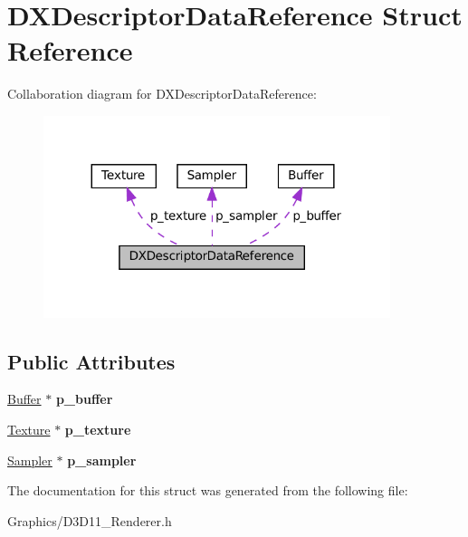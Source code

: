 \hypertarget{structDXDescriptorDataReference}{}\section{D\+X\+Descriptor\+Data\+Reference Struct Reference}
\label{structDXDescriptorDataReference}


Collaboration diagram for D\+X\+Descriptor\+Data\+Reference\+:\nopagebreak
\begin{figure}[H]
\begin{center}
\leavevmode
\includegraphics[width=287pt]{structDXDescriptorDataReference__coll__graph}
\end{center}
\end{figure}
\subsection*{Public Attributes}
\begin{DoxyCompactItemize}
\item 
\mbox{\label{structDXDescriptorDataReference_a0076efe8a7e79cc0e8e4bdcda8d4fb55}} 
\hyperlink{classBuffer}{Buffer} $\ast$ {\bfseries p\+\_\+buffer}
\item 
\mbox{\label{structDXDescriptorDataReference_a6452f35f2369de86d19909ec25df26d3}} 
\hyperlink{classTexture}{Texture} $\ast$ {\bfseries p\+\_\+texture}
\item 
\mbox{\label{structDXDescriptorDataReference_a93f27eb64b37a8f22a8334b15452fe39}} 
\hyperlink{classSampler}{Sampler} $\ast$ {\bfseries p\+\_\+sampler}
\end{DoxyCompactItemize}


The documentation for this struct was generated from the following file\+:\begin{DoxyCompactItemize}
\item 
Graphics/D3\+D11\+\_\+\+Renderer.\+h\end{DoxyCompactItemize}
